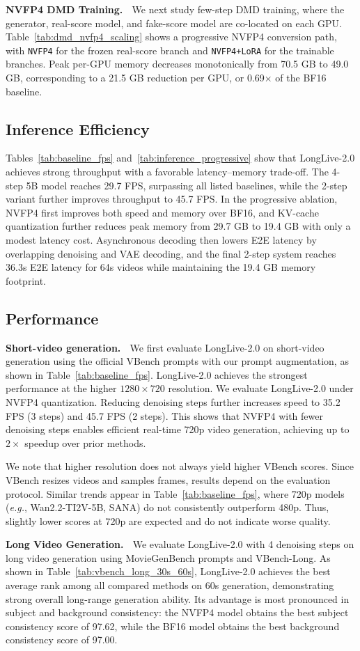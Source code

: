 \textbf{NVFP4 DMD Training.} $\;$
We next study few-step DMD training, where the generator, real-score model, and fake-score model are co-located on each GPU. Table~\ref{tab:dmd_nvfp4_scaling} shows a progressive NVFP4 conversion path, with \texttt{NVFP4} for the frozen real-score branch and \texttt{NVFP4+LoRA} for the trainable branches. Peak per-GPU memory decreases monotonically from 70.5 GB to 49.0 GB, corresponding to a 21.5 GB reduction per GPU, or 0.69$\times$ of the BF16 baseline.

\subsection{Inference Efficiency}
Tables~\ref{tab:baseline_fps} and~\ref{tab:inference_progressive}
show that LongLive-2.0 achieves strong throughput with a favorable latency--memory trade-off. The 4-step 5B model reaches 29.7 FPS, surpassing all listed baselines, while the 2-step variant further improves throughput to 45.7 FPS. In the progressive ablation, NVFP4 first improves both speed and memory over BF16, and KV-cache quantization further reduces peak memory from 29.7 GB to 19.4 GB with only a modest latency cost. Asynchronous decoding then lowers E2E latency by overlapping denoising and VAE decoding, and the final 2-step system reaches 36.3s E2E latency for 64s videos while maintaining the 19.4 GB memory footprint.


\subsection{Performance}
\textbf{Short-video generation.} $\;$
We first evaluate LongLive-2.0 on short-video generation using the official VBench prompts with our prompt augmentation, as shown in Table~\ref{tab:baseline_fps}.
LongLive-2.0 achieves the strongest performance at the higher $1280{\times}720$ resolution. 
We evaluate LongLive-2.0 under NVFP4 quantization. Reducing denoising steps further increases speed to 35.2 FPS (3 steps) and 45.7 FPS (2 steps). This shows that NVFP4 with fewer denoising steps enables efficient real-time 720p video generation, achieving up to $2{\times}$ speedup over prior methods.

We note that higher resolution does not always yield higher VBench scores. Since VBench resizes videos and samples frames, results depend on the evaluation protocol. Similar trends appear in Table~\ref{tab:baseline_fps}, where 720p models (\textit{e.g.}, Wan2.2-TI2V-5B, SANA) do not consistently outperform 480p. Thus, slightly lower scores at 720p are expected and do not indicate worse quality.

\textbf{Long Video Generation.} $\;$
We evaluate LongLive-2.0 with 4 denoising steps on long video generation using MovieGenBench prompts and VBench-Long. As shown in Table~\ref{tab:vbench_long_30s_60s}, LongLive-2.0 achieves the best average rank among all compared methods on 60s generation, demonstrating strong overall long-range generation ability. Its advantage is most pronounced in subject and background consistency: the NVFP4 model obtains the best subject consistency score of 97.62, while the BF16 model obtains the best background consistency score of 97.00.
